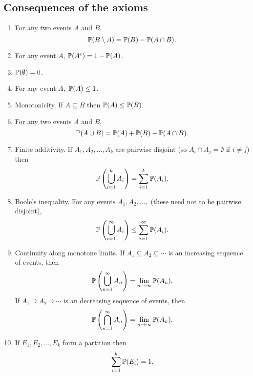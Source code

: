 \documentclass[10pt, a4paper]{article}
\begin{document}
\subsection{Consequences of the axioms}
\begin{enumerate}[label = C\arabic*]
    \item For any two events $A$ and $B$,
    \[
    \P(B \setminus A) = \P(B) - \P(A \cap B).
    \]
    \item For any event $A$, $\P(A ^ c) = 1 - \P(A)$.
    \item $\P(\emptyset) = 0$.
    \item For any event $A,\ \P(A) \leq 1$.
    \item Monotonicity. If $A \subseteq B$ then $\P(A) \leq \P(B)$.
    \item For any two events $A$ and $B$,
    \[
    \P(A \cup B) = \P(A) + \P(B) - \P(A \cap B).
    \]
    \item Finite additivity. If $A_1, A_2, \dots, A_k$ are pairwise disjoint (so $A_i \cap A_j = \emptyset$ if $i \neq j$) then
    \[
    \P\left(\bigcup_{i = 1}^{k}A_i\right) = \sum_{i = 1}^{k}\P(A_i).
    \]
    \item Boole's inequality. For any events $A_1, A_2, \dots,$ (these need not to be pairwise disjoint),
    \[
    \P\left(\bigcup_{i = 1}^{\infty}A_i\right) \leq \sum_{i = 1}^{\infty}\P(A_i).
    \]
    \item Continuity along monotone limits. If $A_1 \subseteq A_2 \subseteq \dotsi$ is an increasing sequence of events, then
    \[
    \P\left(\bigcup_{n = 1}^{\infty}A_n\right) = \lim_{n \rightarrow \infty}\P(A_n).
    \]
    If $A_1 \supseteq A_2 \supseteq \dotsi$ is an decreasing sequence of events, then
    \[
    \P\left(\bigcap_{n = 1}^{\infty}A_n\right) = \lim_{n \rightarrow \infty}\P(A_n).
    \]
    \item
    If $E_1, E_2, \dotsc, E_k$ form a partition then
    \[
    \sum_{i = 1}^{k}\P(E_i) = 1.
    \]
\end{enumerate}
\end{document}
